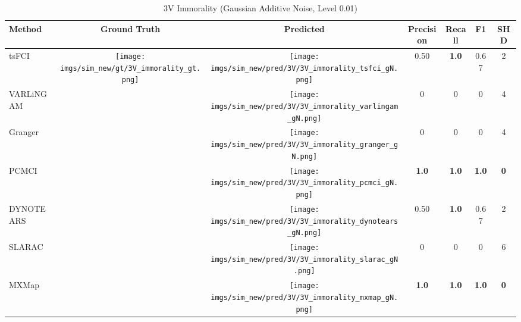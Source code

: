 \begin{table}[htb]
\begin{tabular}{l|c|c|c|c|c|c}
Method    & Ground Truth      & Predicted & Precision    & Recall       & F1           & SHD        \\ \hline
tsFCI     & \multirow{7}{*}[-9.5em]{\begin{minipage}{.17\linewidth} \centering \texttt{[image: imgs/sim\_new/gt/3V\_immorality\_gt.png]} \end{minipage}} & \begin{minipage}{.17\linewidth} \centering \texttt{[image: imgs/sim\_new/pred/3V/3V\_immorality\_tsfci\_gN.png]} \end{minipage}           & 0.50         & \textbf{1.0} & 0.67         & 2          \\
VARLiNGAM &                   & \begin{minipage}{.17\linewidth} \centering \texttt{[image: imgs/sim\_new/pred/3V/3V\_immorality\_varlingam\_gN.png]} \end{minipage}  & 0            & 0            & 0            & 4          \\
Granger   &                   & \begin{minipage}{.17\linewidth} \centering \texttt{[image: imgs/sim\_new/pred/3V/3V\_immorality\_granger\_gN.png]} \end{minipage} & 0            & 0            & 0            & 4          \\
PCMCI     &                   & \begin{minipage}{.17\linewidth} \centering \texttt{[image: imgs/sim\_new/pred/3V/3V\_immorality\_pcmci\_gN.png]} \end{minipage}  & \textbf{1.0} & \textbf{1.0} & \textbf{1.0} & \textbf{0} \\
DYNOTEARS &                   &  \begin{minipage}{.17\linewidth} \centering \texttt{[image: imgs/sim\_new/pred/3V/3V\_immorality\_dynotears\_gN.png]} \end{minipage}  & 0.50         & \textbf{1.0} & 0.67         & 2          \\
SLARAC    &                   & \begin{minipage}{.17\linewidth} \centering \texttt{[image: imgs/sim\_new/pred/3V/3V\_immorality\_slarac\_gN.png]} \end{minipage}  & 0            & 0            & 0            & 6          \\ \cline{1-1} \cline{3-7} 
MXMap     &                   &  \begin{minipage}{.17\linewidth} \centering \texttt{[image: imgs/sim\_new/pred/3V/3V\_immorality\_mxmap\_gN.png]} \end{minipage}  & \textbf{1.0} & \textbf{1.0} & \textbf{1.0} & \textbf{0}
\end{tabular}
\caption{3V Immorality (Gaussian Additive Noise, Level 0.01)}
\label{tab:3V_immo_gN}
\end{table}


